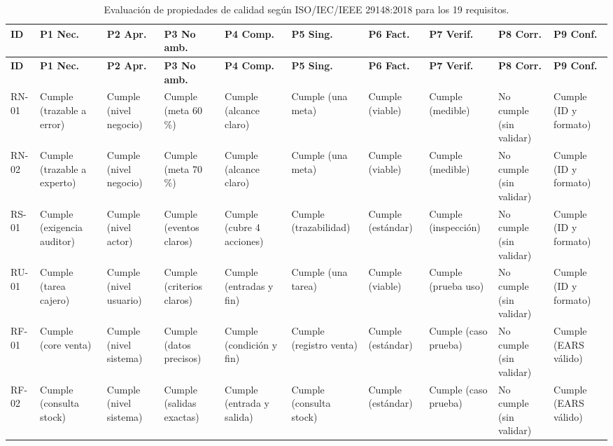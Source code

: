 \documentclass[onecolumn,12pt]{IEEEtran}
\begin{document}
	\begin{longtable}{>{\raggedright\arraybackslash}p{1.2cm} >{\raggedright\arraybackslash}p{1.2cm} >{\raggedright\arraybackslash}p{1.2cm} >{\raggedright\arraybackslash}p{1.3cm} >{\raggedright\arraybackslash}p{1.3cm} >{\raggedright\arraybackslash}p{1.2cm} >{\raggedright\arraybackslash}p{1.3cm} >{\raggedright\arraybackslash}p{1.3cm} >{\raggedright\arraybackslash}p{1.5cm} >{\raggedright\arraybackslash}p{1.2cm}}
		\caption{Evaluaci\'on de propiedades de calidad seg\'un ISO/IEC/IEEE 29148:2018 para los 19 requisitos.}
		\label{tab:eval_propiedades}\\
		\toprule
		\textbf{ID} & \textbf{P1 Nec.} & \textbf{P2 Apr.} & \textbf{P3 No amb.} & \textbf{P4 Comp.} & \textbf{P5 Sing.} & \textbf{P6 Fact.} & \textbf{P7 Verif.} & \textbf{P8 Corr.} & \textbf{P9 Conf.} \\
		\midrule
		\endfirsthead
		\toprule
		\textbf{ID} & \textbf{P1 Nec.} & \textbf{P2 Apr.} & \textbf{P3 No amb.} & \textbf{P4 Comp.} & \textbf{P5 Sing.} & \textbf{P6 Fact.} & \textbf{P7 Verif.} & \textbf{P8 Corr.} & \textbf{P9 Conf.} \\
		\midrule
		\endhead
		\bottomrule
		\endfoot
		RN-01 & Cumple (trazable a error) & Cumple (nivel negocio) & Cumple (meta 60\,\%) & Cumple (alcance claro) & Cumple (una meta) & Cumple (viable) & Cumple (medible) & No cumple (sin validar) & Cumple (ID y formato) \\
		\midrule
		RN-02 & Cumple (trazable a experto) & Cumple (nivel negocio) & Cumple (meta 70\,\%) & Cumple (alcance claro) & Cumple (una meta) & Cumple (viable) & Cumple (medible) & No cumple (sin validar) & Cumple (ID y formato) \\
		\midrule
		RS-01 & Cumple (exigencia auditor) & Cumple (nivel actor) & Cumple (eventos claros) & Cumple (cubre 4 acciones) & Cumple (trazabilidad) & Cumple (est\'andar) & Cumple (inspecci\'on) & No cumple (sin validar) & Cumple (ID y formato) \\
		\midrule
		RU-01 & Cumple (tarea cajero) & Cumple (nivel usuario) & Cumple (criterios claros) & Cumple (entradas y fin) & Cumple (una tarea) & Cumple (viable) & Cumple (prueba uso) & No cumple (sin validar) & Cumple (ID y formato) \\
		\midrule
		RF-01 & Cumple (core venta) & Cumple (nivel sistema) & Cumple (datos precisos) & Cumple (condici\'on y fin) & Cumple (registro venta) & Cumple (est\'andar) & Cumple (caso prueba) & No cumple (sin validar) & Cumple (EARS v\'alido) \\
		\midrule
		RF-02 & Cumple (consulta stock) & Cumple (nivel sistema) & Cumple (salidas exactas) & Cumple (entrada y salida) & Cumple (consulta stock) & Cumple (est\'andar) & Cumple (caso prueba) & No cumple (sin validar) & Cumple (EARS v\'alido) \\

\end{longtable}
\end{document}
